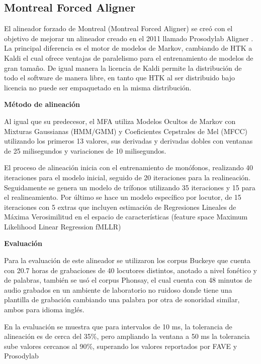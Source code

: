 \subsection{Montreal Forced Aligner}



El alineador forzado de Montreal (Montreal Forced Aligner) se creó con el objetivo de mejorar un alineador creado en el 2011 llamado Prosodylab Aligner \cite{Gorman2011Prosodylab-aligner:Speech}. La principal diferencia es el motor de modelos de Markov, cambiando de HTK a Kaldi el cual ofrece ventajas de paralelismo para el entrenamiento de modelos de gran tamaño. De igual manera la licencia de Kaldi permite la distribución de todo el software de manera libre, en tanto que HTK al ser distribuido bajo licencia no puede ser empaquetado en la misma distribución.

\textbf{Método de alineación}

Al igual que su predecesor, el MFA utiliza Modelos Ocultos de Markov con Mixturas Gaussianas (HMM/GMM) y Coeficientes Cepstrales de Mel (MFCC) utilizando los primeros 13 valores, sus derivadas y derivadas dobles con ventanas de 25 milisegundos y variaciones de 10 milisegundos.


El proceso de alineación inicia con el entrenamiento de monófonos, realizando 40 iteraciones para el modelo inicial, seguido de 20 iteraciones para la realineación. Seguidamente se genera un modelo de trífonos utilizando 35 iteraciones y 15 para el realineamiento. Por último se hace un modelo específico por locutor, de 15 iteraciones con 5 extras que incluyen estimación de Regresiones Lineales de Máxima Verosimilitud en el espacio de características (feature space Maximum Likelihood Linear Regression fMLLR)   

\textbf{Evaluación}

Para la evaluación de este alineador se utilizaron los corpus Buckeye \cite{PittTheReliability} que cuenta con 20.7 horas de grabaciones de 40 locutores distintos, anotado a nivel fonético y de palabras, también se usó el corpus Phonsay, el cual cuenta con 48 minutos de audio grabados en un ambiente de laboratorio no ruidoso donde tiene una plantilla de grabación cambiando una palabra por otra de sonoridad similar, ambos para idioma inglés.

En la evaluación se muestra que para intervalos de 10 ms, la tolerancia de alineación es de cerca del 35\%, pero ampliando la ventana a 50 ms la tolerancia sube valores cercanos al 90\%, superando los valores reportados por FAVE\cite{Rosenfelder2014FAVE:Suite} y Prosodylab \cite{Gorman2011Prosodylab-aligner:Speech}


